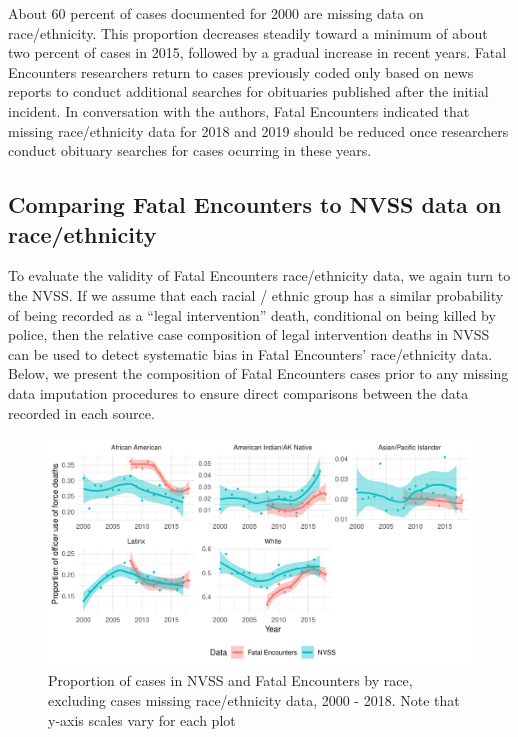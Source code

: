 \documentclass{article}
\begin{document}
About 60 percent of cases documented for 2000 are missing data on race/ethnicity. This proportion decreases steadily toward a minimum of about two percent of cases in 2015, followed by a gradual increase in recent years. Fatal Encounters researchers return to cases previously coded only based on news reports to conduct additional searches for obituaries published after the initial incident. In conversation with the authors, Fatal Encounters indicated that missing race/ethnicity data for 2018 and 2019 should be reduced once researchers conduct obituary searches for cases ocurring in these years.

\subsection{Comparing Fatal Encounters to NVSS data on race/ethnicity}

To evaluate the validity of Fatal Encounters race/ethnicity data, we again turn to the NVSS. If we assume that each racial / ethnic group has a similar probability of being recorded as a ``legal intervention'' death, conditional on being killed by police, then the relative case composition of legal intervention deaths in NVSS can be used to detect systematic bias in Fatal Encounters' race/ethnicity data. Below, we present the composition of Fatal Encounters cases prior to any missing data imputation procedures to ensure direct comparisons between the data recorded in each source.

\begin{figure}
	\centering
	\includegraphics[width = \linewidth]{vis/fe_nvss_race_compare_na_rm.pdf}
	\caption{Proportion of cases in NVSS and Fatal Encounters by race, excluding cases missing race/ethnicity data, 2000 - 2018. Note that y-axis scales vary for each plot}
	\label{fig:compare_missing_na_rm}
\end{figure}
\end{document}

